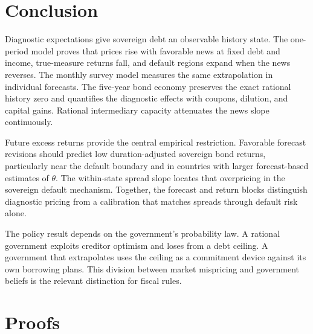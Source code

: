 \documentclass[11pt]{article}
\theoremstyle{definition}
\begin{document}
\section{Conclusion}\label{sec:conclusion}

Diagnostic expectations give sovereign debt an observable history state. The one-period model proves that prices rise with favorable news at fixed debt and income, true-measure returns fall, and default regions expand when the news reverses. The monthly survey model measures the same extrapolation in individual forecasts. The five-year bond economy preserves the exact rational history zero and quantifies the diagnostic effects with coupons, dilution, and capital gains. Rational intermediary capacity attenuates the news slope continuously.

Future excess returns provide the central empirical restriction. Favorable forecast revisions should predict low duration-adjusted sovereign bond returns, particularly near the default boundary and in countries with larger forecast-based estimates of $\theta$. The within-state spread slope locates that overpricing in the sovereign default mechanism. Together, the forecast and return blocks distinguish diagnostic pricing from a calibration that matches spreads through default risk alone.

The policy result depends on the government's probability law. A rational government exploits creditor optimism and loses from a debt ceiling. A government that extrapolates uses the ceiling as a commitment device against its own borrowing plans. This division between market mispricing and government beliefs is the relevant distinction for fiscal rules.

\clearpage
\appendix
\renewcommand{\theequation}{\thesection.\arabic{equation}}

\section{Proofs}\label{app:proofs}
\end{document}
